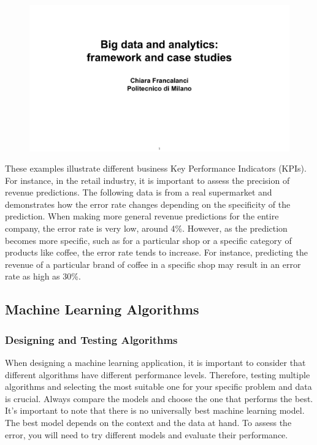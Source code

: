 \begin{figure}[!h]
    \centering
    \includegraphics[page=23, trim = 1cm 1.5cm 0 1cm 0cm, clip, width=\textwidth]{images/06 - BIG_DATA.pdf}
\end{figure}

These examples illustrate different business Key Performance Indicators
(KPIs). For instance, in the retail industry, it is important to assess
the precision of revenue predictions. The following data is from a real
supermarket and demonstrates how the error rate changes depending on the
specificity of the prediction. When making more general revenue
predictions for the entire company, the error rate is very low, around
4\%. However, as the prediction becomes more specific, such as for a
particular shop or a specific category of products like coffee, the
error rate tends to increase. For instance, predicting the revenue of a
particular brand of coffee in a specific shop may result in an error
rate as high as 30\%.

\subsection{Machine Learning Algorithms}

\subsubsection{Designing and Testing Algorithms}

When designing a machine learning application, it is important to
consider that different algorithms have different performance levels.
Therefore, testing multiple algorithms and selecting the most suitable
one for your specific problem and data is crucial. Always compare the
models and choose the one that performs the best. It's important to note
that there is no universally best machine learning model. The best model
depends on the context and the data at hand. To assess the error, you
will need to try different models and evaluate their performance.

